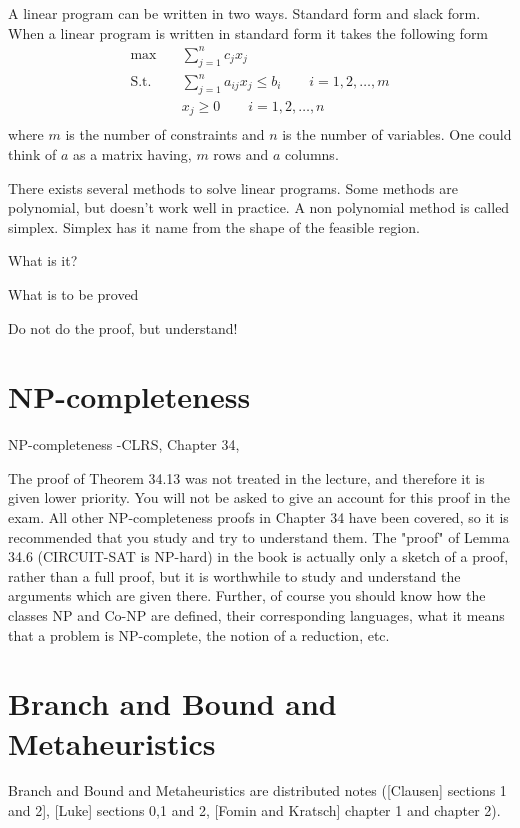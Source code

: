 \documentclass[10pt]{article}
\begin{document}
A linear program can be written in two ways. Standard form and slack form. When a linear program is written in standard form it takes the following form
\begin{align*}
\max &\quad \sum_{j=1}^n c_jx_j  \\ 
 \text{S.t.} &\quad \sum_{j=1}^n a_{ij}x_j \leq b_i \qquad i=1,2,\ldots,m\\
             &\quad x_j \geq 0 \qquad i=1,2,\ldots,n\\
\end{align*}
where $m$ is the number of constraints and $n$ is the number of variables. One could think of $a$ as a matrix having, $m$ rows and $a$ columns.

There exists several methods to solve linear programs. Some methods are polynomial, but doesn't work well in practice. A non polynomial method is called simplex. Simplex has it name from the shape of the feasible region.


What is it?

What is to be proved

Do not do the proof, but understand!



\section{NP-completeness} %
\label{sec:np_completeness}
NP-completeness -CLRS, Chapter 34,   


The proof of  Theorem 34.13 was not treated in the lecture, and therefore it is given lower priority. You will not be asked to give an account for this proof in the exam. All other NP-completeness proofs in Chapter 34 have been covered, so it is recommended that you study and try to understand them. The "proof" of Lemma 34.6 (CIRCUIT-SAT is NP-hard) in the book is actually only a sketch of a proof, rather than a full proof, but it is worthwhile to study and understand the arguments which are given there. Further, of course you should know how the classes NP and Co-NP are defined, their corresponding languages, what it means that a problem is NP-complete, the notion of a reduction, etc.


\section{Branch and Bound and Metaheuristics} %
\label{sec:branch_and_bound_and_metaheuristics}
Branch and Bound and Metaheuristics are  distributed notes ([Clausen] sections 1 and 2], [Luke] sections 0,1 and 2, [Fomin and Kratsch] chapter 1 and chapter 2).                                                                                                                                                          
\end{document}

